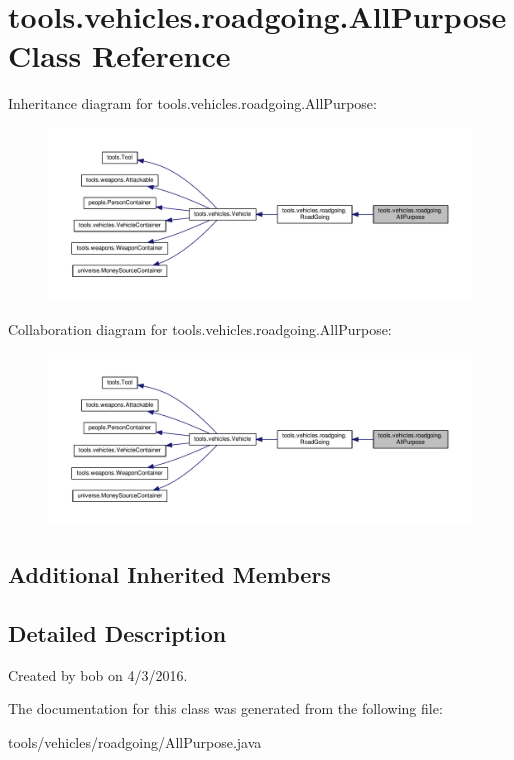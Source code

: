 \hypertarget{classtools_1_1vehicles_1_1roadgoing_1_1_all_purpose}{}\section{tools.\+vehicles.\+roadgoing.\+All\+Purpose Class Reference}
\label{classtools_1_1vehicles_1_1roadgoing_1_1_all_purpose}


Inheritance diagram for tools.\+vehicles.\+roadgoing.\+All\+Purpose\+:\nopagebreak
\begin{figure}[H]
\begin{center}
\leavevmode
\includegraphics[width=350pt]{classtools_1_1vehicles_1_1roadgoing_1_1_all_purpose__inherit__graph}
\end{center}
\end{figure}


Collaboration diagram for tools.\+vehicles.\+roadgoing.\+All\+Purpose\+:\nopagebreak
\begin{figure}[H]
\begin{center}
\leavevmode
\includegraphics[width=350pt]{classtools_1_1vehicles_1_1roadgoing_1_1_all_purpose__coll__graph}
\end{center}
\end{figure}
\subsection*{Additional Inherited Members}


\subsection{Detailed Description}
Created by bob on 4/3/2016. 

The documentation for this class was generated from the following file\+:\begin{DoxyCompactItemize}
\item 
tools/vehicles/roadgoing/All\+Purpose.\+java\end{DoxyCompactItemize}
